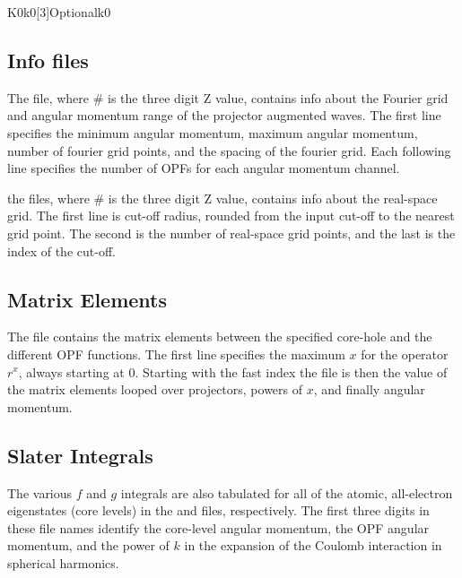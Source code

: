 \documentclass[11pt]{report}
\begin{document}
\begin{Card}{K0}{k0[3]}{Optional}{k0}

\subsection{Info files}
The  file, where \# is the three digit Z value, contains info about the Fourier grid and angular momentum range of the projector augmented waves. The first line specifies the minimum angular momentum, maximum angular momentum, number of fourier grid points, and the spacing of the fourier grid. Each following line specifies the number of OPFs for each angular momentum channel. 

the  files, where \# is the three digit Z value, contains info about the real-space grid. The first line is cut-off radius, rounded from the input cut-off to the nearest grid point. The second is the number of real-space grid points, and the last is the index of the cut-off.


\subsection{Matrix Elements}

The  file contains the matrix elements between the specified core-hole and the different OPF functions. The first line specifies the maximum $x$ for the operator $r^x$, always starting at 0. Starting with the fast index the file is then the value of the matrix elements looped over projectors, powers of $x$, and finally angular momentum.

\subsection{Slater Integrals}
The various $f$ and $g$ integrals are also tabulated for all of the atomic, all-electron eigenstates (core levels) in the  and  files, respectively. The first three digits in these file names identify the core-level angular momentum, the OPF angular momentum, and the power of $k$ in the expansion of the Coulomb interaction in spherical harmonics. 


\end{Card}
\end{document}
